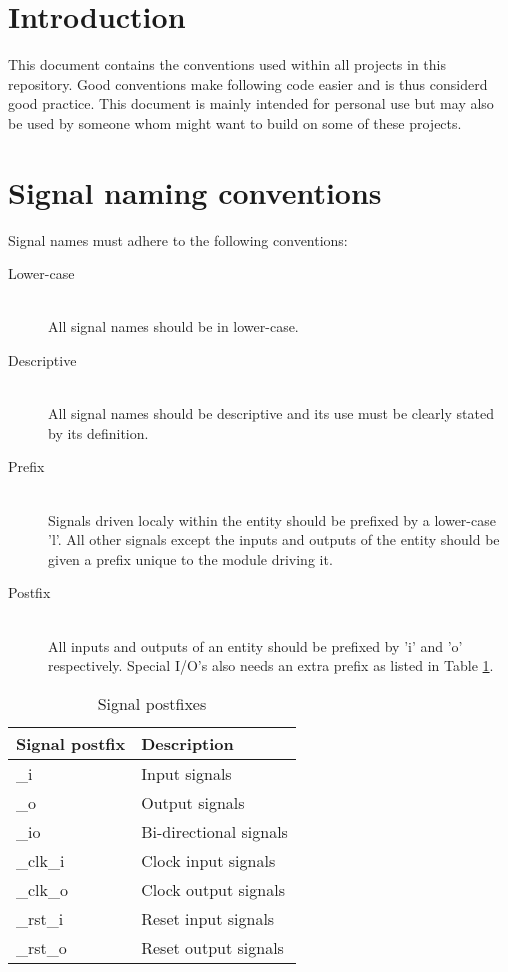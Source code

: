\documentclass{article}
\begin{document}
\section{Introduction}
This document contains the conventions used within all projects in this repository. Good conventions make following code easier and is thus considerd good practice. This document is mainly intended for personal use but may also be used by someone whom might want to build on some of these projects.

\section{Signal naming conventions}

Signal names must adhere to the following conventions:
\begin{description}
	\item[Lower-case] \hfill \\
		All signal names should be in lower-case.
	\item[Descriptive] \hfill \\
		All signal names should be descriptive and its use must be clearly stated by its definition.
	\item[Prefix] \hfill \\
		Signals driven localy within the entity should be prefixed by a lower-case 'l'. 	All other signals except the inputs and outputs of the entity should be given a prefix unique to the module driving it.
	\item[Postfix] \hfill \\
		All inputs and outputs of an entity should be prefixed by 'i' and 'o' respectively. Special I/O's also needs an extra prefix as listed in Table \ref{tab:postfix}.
\end{description}
\begin{table}[h]
	\begin{center}
	\begin{tabular}{| l | l |}
	\hline
	\textbf{Signal postfix} & \textbf{Description} \\ \hline
	\_i       & Input signals          \\ \hline
	\_o       & Output signals         \\ \hline
	\_io      & Bi-directional signals \\ \hline
	\_clk\_i & Clock input signals    \\ \hline
	\_clk\_o & Clock output signals   \\ \hline
	\_rst\_i & Reset input signals    \\ \hline
	\_rst\_o & Reset output signals   \\ \hline
	\end{tabular}
	\end{center}
\caption{Signal postfixes}
\label{tab:postfix}
\end{table}
\end{document}
